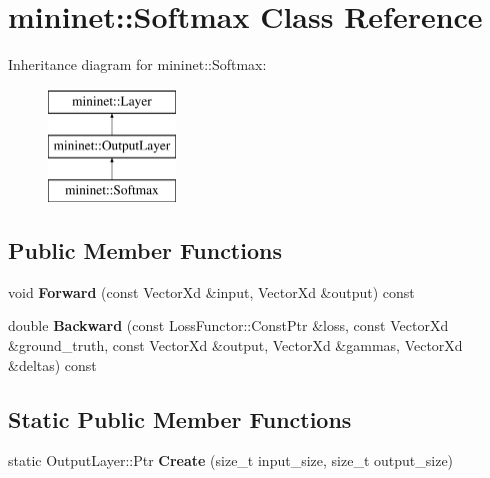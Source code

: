 \hypertarget{classmininet_1_1_softmax}{}\section{mininet\+:\+:Softmax Class Reference}
\label{classmininet_1_1_softmax}
Inheritance diagram for mininet\+:\+:Softmax\+:\begin{figure}[H]
\begin{center}
\leavevmode
\includegraphics[height=3.000000cm]{classmininet_1_1_softmax}
\end{center}
\end{figure}
\subsection*{Public Member Functions}
\begin{DoxyCompactItemize}
\item 
\hypertarget{classmininet_1_1_softmax_a9305e1361a9da25ed3f528aaeeb20375}{}\label{classmininet_1_1_softmax_a9305e1361a9da25ed3f528aaeeb20375} 
void {\bfseries Forward} (const Vector\+Xd \&input, Vector\+Xd \&output) const
\item 
\hypertarget{classmininet_1_1_softmax_a0cbd69a87c7c960989e55ce315aedaa6}{}\label{classmininet_1_1_softmax_a0cbd69a87c7c960989e55ce315aedaa6} 
double {\bfseries Backward} (const Loss\+Functor\+::\+Const\+Ptr \&loss, const Vector\+Xd \&ground\+\_\+truth, const Vector\+Xd \&output, Vector\+Xd \&gammas, Vector\+Xd \&deltas) const
\end{DoxyCompactItemize}
\subsection*{Static Public Member Functions}
\begin{DoxyCompactItemize}
\item 
\hypertarget{classmininet_1_1_softmax_a3a3600298023ff609ca87d620424ae51}{}\label{classmininet_1_1_softmax_a3a3600298023ff609ca87d620424ae51} 
static Output\+Layer\+::\+Ptr {\bfseries Create} (size\+\_\+t input\+\_\+size, size\+\_\+t output\+\_\+size)
\end{DoxyCompactItemize}
